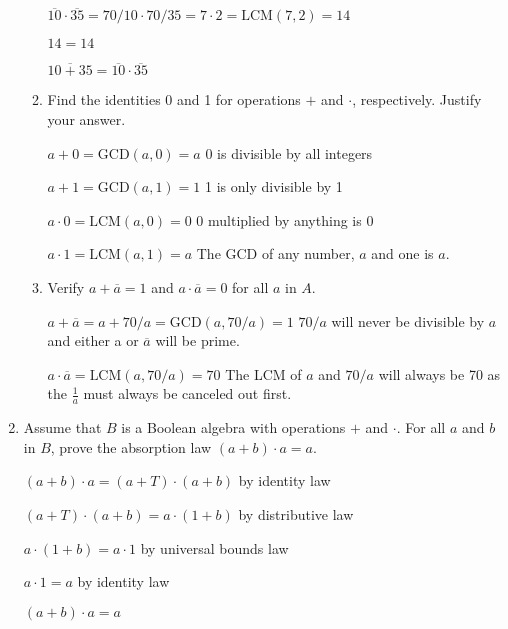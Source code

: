 \documentclass[12pt,letterpaper,titlepage]{article}
\begin{document}
\begin{raggedright}
\begin{enumerate}
\begin{enumerate}[label=(\alph*)]
$\overline{10}\cdot\overline{35} = 70 / 10 \cdot 70 / 35 = 7 \cdot 2 = \text{LCM}(7, 2) = 14$

$14 = 14$

$\overline{10+35}=\overline{10}\cdot\overline{35}$

\item Find the identities 0 and 1 for operations $+$ and $\cdot$, respectively. Justify your answer.

$a + 0 = \text{GCD}(a, 0) = a$ 0 is divisible by all integers

$a + 1 = \text{GCD}(a, 1) = 1$ 1 is only divisible by 1

$a \cdot 0 = \text{LCM}(a, 0) = 0$ 0 multiplied by anything is 0

$a \cdot 1 = \text{LCM}(a, 1) = a$ The GCD of any number, $a$ and one is $a$.

\item Verify $a+\overline{a}=1$ and $a\cdot\overline{a}=0$ for all $a$ in $A$.

$a + \overline{a} = a + 70 / a = \text{GCD}(a, 70 / a) = 1$ $70 / a$ will never be divisible by $a$ and either a or $\overline{a}$ will be prime.

$a\cdot\overline{a}= \text{LCM}(a, 70 / a) = 70$ The LCM of $a$ and $70 / a$ will always be 70 as the $\frac{1}{a}$ must always be canceled out first.

\end{enumerate}

\item Assume that $B$ is a Boolean algebra with operations $+$ and $\cdot$. For all $a$ and $b$ in $B$, prove the absorption law $(a + b) \cdot a = a$.

$(a + b) \cdot a = (a+T)\cdot(a+b)$ by identity law

$(a+T)\cdot(a+b) = a \cdot (1+b)$ by distributive law

$a \cdot (1+b) = a \cdot 1$ by universal bounds law

$a \cdot 1 = a$ by identity law

$(a + b) \cdot a = a$

\end{enumerate}
\end{raggedright}
\end{document}
